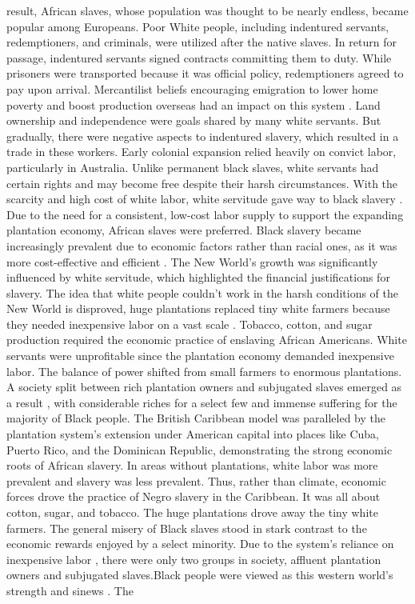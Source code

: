 result, African slaves, whose population was thought to be nearly endless, became popular among Europeans. Poor White people, including indentured servants, redemptioners, and criminals, were utilized after the native slaves. In return for passage, indentured servants signed contracts committing them to duty. While prisoners were transported because it was official policy, redemptioners agreed to pay upon arrival. Mercantilist beliefs encouraging emigration to lower home poverty and boost production overseas had an impact on this system . Land ownership and independence were goals shared by many white servants. But gradually, there were negative aspects to indentured slavery, which resulted in a trade in these workers. Early colonial expansion relied heavily on convict labor, particularly in Australia. Unlike permanent black slaves, white servants had certain rights and may become free despite their harsh circumstances. With the scarcity and high cost of white labor, white servitude gave way to black slavery . Due to the need for a consistent, low-cost labor supply to support the expanding plantation economy, African slaves were preferred. Black slavery became increasingly prevalent due to economic factors rather than racial ones, as it was more cost-effective and efficient . The New World's growth was significantly influenced by white servitude, which highlighted the financial justifications for slavery. The idea that white people couldn't work in the harsh conditions of the New World is disproved, huge plantations replaced tiny white farmers because they needed inexpensive labor on a vast scale . Tobacco, cotton, and sugar production required the economic practice of enslaving African Americans. White servants were unprofitable since the plantation economy demanded inexpensive labor. The balance of power shifted from small farmers to enormous plantations. A society split between rich plantation owners and subjugated slaves emerged as a result , with considerable riches for a select few and immense suffering for the majority of Black people. The British Caribbean model was paralleled by the plantation system's extension under American capital into places like Cuba, Puerto Rico, and the Dominican Republic, demonstrating the strong economic roots of African slavery. In areas without plantations, white labor was more prevalent and slavery was less prevalent. Thus, rather than climate, economic forces  drove the practice of Negro slavery in the Caribbean. It was all about cotton, sugar, and tobacco. The huge plantations drove away the tiny white farmers. The general misery of Black slaves stood in stark contrast to the economic rewards enjoyed by a select minority. Due to the system's reliance on inexpensive labor , there were only two groups in society, affluent plantation owners and subjugated slaves.Black people were viewed as this western world's strength and sinews . The 